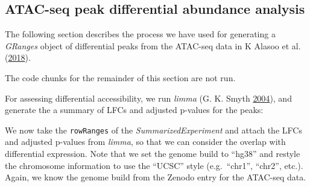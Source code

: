\documentclass[
]{article}
\newenvironment{Shaded}{}{}
\newcommand{\DataTypeTok}[1]{\textcolor[rgb]{0.56,0.13,0.00}{#1}}
\newcommand{\KeywordTok}[1]{\textcolor[rgb]{0.00,0.44,0.13}{\textbf{#1}}}
\newcommand{\NormalTok}[1]{#1}
\newcommand{\OperatorTok}[1]{\textcolor[rgb]{0.40,0.40,0.40}{#1}}
\newcommand{\StringTok}[1]{\textcolor[rgb]{0.25,0.44,0.63}{#1}}
\begin{document}
\hypertarget{atac-seq-peak-differential-abundance-analysis}{%
\subsection{ATAC-seq peak differential abundance analysis}\label{atac-seq-peak-differential-abundance-analysis}}

The following section describes the process we have used for generating a
\emph{GRanges} object of differential peaks from the ATAC-seq data in K Alasoo et al. (\protect\hyperlink{ref-alasoo}{2018}).

The code chunks for the remainder of this section are not run.

For assessing differential accessibility, we run \emph{limma} (G. K. Smyth \protect\hyperlink{ref-Smyth2004}{2004}), and
generate the a summary of LFCs and adjusted p-values for the peaks:

\begin{Shaded}
\end{Shaded}

We now take the \texttt{rowRanges} of the \emph{SummarizedExperiment} and attach the LFCs
and adjusted p-values from \emph{limma}, so that we can consider the overlap with
differential expression. Note that we set the genome build to ``hg38'' and
restyle the chromosome information to use the ``UCSC'' style
(e.g.~``chr1'', ``chr2'', etc.). Again, we know the genome build from the
Zenodo entry for the ATAC-seq data.
\end{document}
